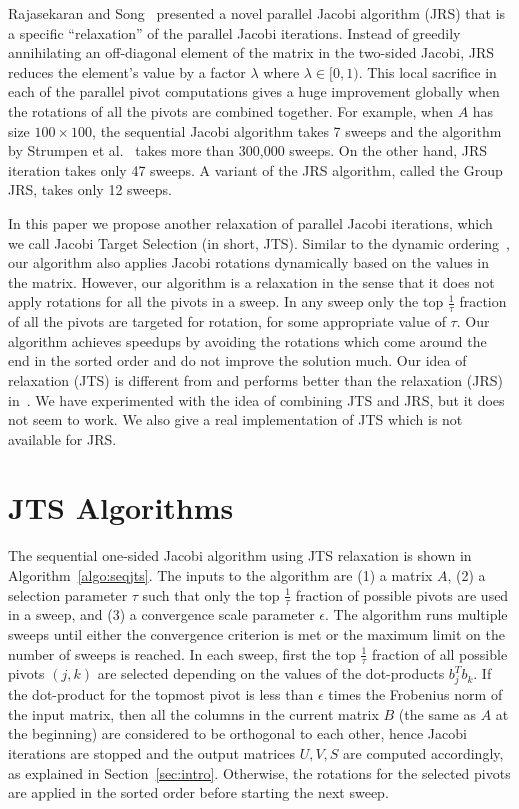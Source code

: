 \documentclass[10pt, conference, compsocconf]{IEEEtran}
\begin{document}
Rajasekaran and Song~\cite{rajasekaran2008relaxation} presented a novel parallel Jacobi algorithm (JRS) that is a specific ``relaxation'' of the parallel Jacobi iterations. Instead of greedily annihilating an off-diagonal element of the matrix in the two-sided Jacobi, JRS reduces the element's value by a factor $\lambda$ where $\lambda \in [0,1)$. This local sacrifice in each of the parallel pivot computations gives a huge improvement globally when the rotations of all the pivots are combined together. For example, when $A$ has size $100 \times 100$, the sequential Jacobi algorithm takes 7 sweeps and the algorithm by Strumpen et al.~\cite{strumpen2003stream} takes more than 300,000 sweeps. On the other hand, JRS iteration takes only 47 sweeps. A variant of the JRS algorithm, called the Group JRS, takes only 12 sweeps.

In this paper we propose another relaxation of parallel Jacobi iterations, which we call Jacobi Target Selection (in short, JTS). Similar to the dynamic ordering~\cite{bevcka2002dynamic}, our algorithm also applies Jacobi rotations dynamically based on the values in the matrix. However, our algorithm is a relaxation in the sense that it does not apply rotations for all the pivots in a sweep. In any sweep only the top $\frac{1}{\tau}$ fraction of all the pivots are targeted for rotation, for some appropriate value of $\tau$. Our algorithm achieves speedups by avoiding the rotations which come around the end in the sorted order and do not improve the solution much. Our idea of relaxation (JTS) is different from and performs better than the relaxation (JRS) in~\cite{rajasekaran2008relaxation}. We have experimented with the idea of combining JTS and JRS, but it does not seem to work. We also give a real implementation of JTS which is not available for JRS.


\section{JTS Algorithms}
\label{sec:jts}

The sequential one-sided Jacobi algorithm using JTS relaxation is shown in Algorithm~\ref{algo:seqjts}. The inputs to the algorithm are (1) a matrix $A$, (2) a selection parameter $\tau$ such that only the top $\frac{1}{\tau}$ fraction of possible pivots are used in a sweep, and (3) a convergence scale parameter $\epsilon$. The algorithm runs multiple sweeps until either the convergence criterion is met or the maximum limit on the number of sweeps is reached. In each sweep, first the top $\frac{1}{\tau}$ fraction of all possible pivots $(j,k)$ are selected depending on the values of the dot-products $b_j^T b_k$. If the dot-product for the topmost pivot is less than $\epsilon$ times the Frobenius norm of the input matrix, then all the columns in the current matrix $B$ (the same as $A$ at the beginning) are considered to be orthogonal to each other, hence Jacobi iterations are stopped and the output matrices $U,V,S$ are computed accordingly, as explained in Section~\ref{sec:intro}. Otherwise, the rotations for the selected pivots are applied in the sorted order before starting the next sweep.
\end{document}
